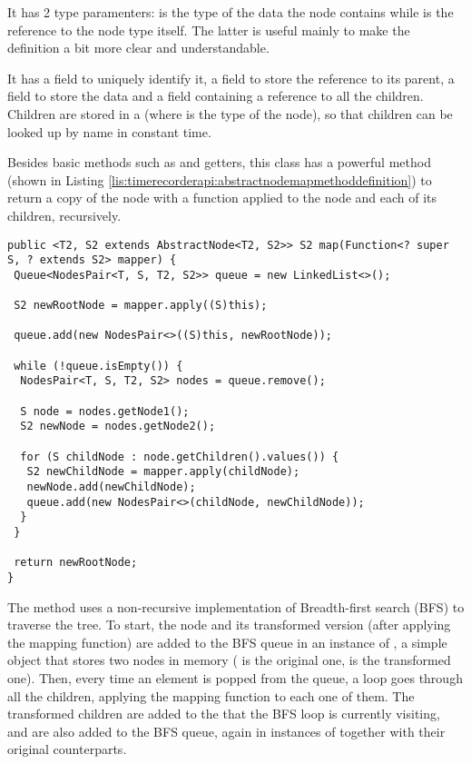 \noindent It has 2 type paramenters:  is the type of the data the node contains while  is the reference to the node type itself. The latter is useful mainly to make the definition a bit more clear and understandable.

\noindent It has a  field to uniquely identify it, a  field to store the reference to its parent, a  field to store the data and a  field containing a reference to all the children. Children are stored in a  (where  is the type of the node), so that children can be looked up by name in constant time.

\noindent Besides basic methods such as  and getters, this class has a powerful  method (shown in Listing \ref{lis:timerecorderapi:abstractnodemapmethoddefinition}) to return a copy of the node with a function applied to the node and each of its children, recursively.

\noindent\begin{minipage}[c]{\linewidth}
\begin{lstlisting}[breaklines,caption={AbstractNode map method definition},label=lis:timerecorderapi:abstractnodemapmethoddefinition]
public <T2, S2 extends AbstractNode<T2, S2>> S2 map(Function<? super S, ? extends S2> mapper) {
 Queue<NodesPair<T, S, T2, S2>> queue = new LinkedList<>();

 S2 newRootNode = mapper.apply((S)this);

 queue.add(new NodesPair<>((S)this, newRootNode));

 while (!queue.isEmpty()) {
  NodesPair<T, S, T2, S2> nodes = queue.remove();

  S node = nodes.getNode1();
  S2 newNode = nodes.getNode2();

  for (S childNode : node.getChildren().values()) {
   S2 newChildNode = mapper.apply(childNode);
   newNode.add(newChildNode);
   queue.add(new NodesPair<>(childNode, newChildNode));
  }
 }

 return newRootNode;
}
\end{lstlisting}
\end{minipage}

\noindent The method uses a non-recursive implementation of Breadth-first search (BFS) \cite{EFM59} to traverse the tree. To start, the node and its transformed version (after applying the mapping function) are added to the BFS queue in an instance of , a simple object that stores two nodes in memory ( is the original one,  is the transformed one). Then, every time an element is popped from the queue, a loop goes through all the  children, applying the mapping function to each one of them. The transformed children are added to the  that the BFS loop is currently visiting, and are also added to the BFS queue, again in instances of  together with their original counterparts.

